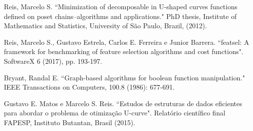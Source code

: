 \documentclass[12pt]{article}
\begin{document}
\begin{thebibliography}{9} \label{sec:referencias}


Reis, Marcelo S. ``Minimization of decomposable in U-shaped curves functions defined on poset chains–algorithms and applications." PhD thesis, Institute of Mathematics and Statistics, University of São Paulo, Brazil, (2012).

Reis, Marcelo S., Gustavo Estrela, Carlos E. Ferreira e Junior Barrera.
``featsel: A framework for benchmarking of feature selection algorithms
and cost functions". SoftwareX 6 (2017), pp. 193-197.

Bryant, Randal E. ``Graph-based algorithms for boolean function manipulation." IEEE Transactions on Computers, 100.8 (1986): 677-691. 

Gustavo E. Matos e Marcelo S. Reis. ``Estudos de estruturas de dados 
eficientes para abordar o problema de otimização U-curve". Relatório
científico final FAPESP, Instituto Butantan, Brasil (2015).

\end{thebibliography}
\end{document}
